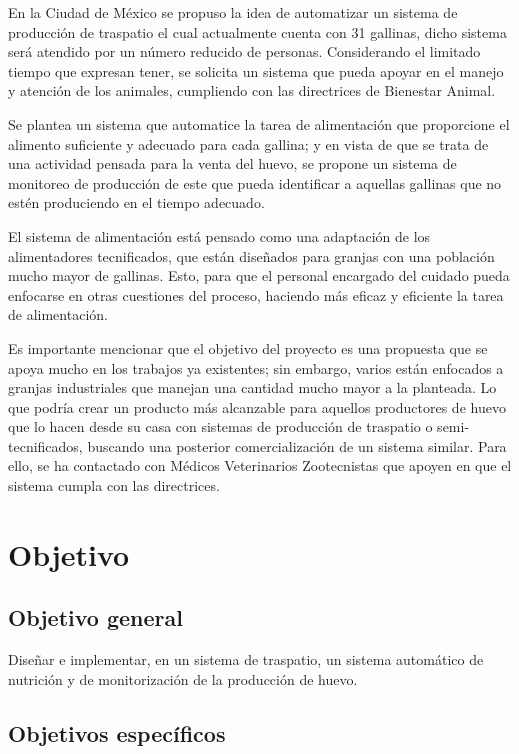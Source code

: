 En la Ciudad de México se propuso la idea de automatizar un sistema de producción de traspatio el cual actualmente cuenta con 31 gallinas, dicho sistema será atendido por un número reducido de personas. Considerando el limitado tiempo que expresan tener, se solicita un sistema que pueda apoyar en el manejo y atención de los animales, cumpliendo con las directrices de Bienestar Animal.

Se plantea un sistema que automatice la tarea de alimentación que proporcione el alimento suficiente y adecuado para cada gallina; y en vista de que se trata de una actividad pensada para la venta del huevo, se propone un sistema de monitoreo de producción de este que pueda identificar a aquellas gallinas que no estén produciendo en el tiempo adecuado.

El sistema de alimentación está pensado como una adaptación de los alimentadores tecnificados, que están diseñados para granjas con una población mucho mayor de gallinas. Esto, para que el personal encargado del cuidado pueda enfocarse en otras cuestiones del proceso, haciendo más eficaz y eficiente la tarea de alimentación.

Es importante mencionar que el objetivo del proyecto es una propuesta que se apoya mucho en los trabajos ya existentes; sin embargo, varios están enfocados a granjas industriales que manejan una cantidad mucho mayor a la planteada. Lo que podría crear un producto más alcanzable para aquellos productores de huevo que lo hacen desde su casa con sistemas de producción de traspatio o semi-tecnificados, buscando una posterior comercialización de un sistema similar. Para ello, se ha contactado con Médicos Veterinarios Zootecnistas que apoyen en que el sistema cumpla con las directrices.

\newpage
\section{Objetivo}
%

\subsection{Objetivo general}
Diseñar e implementar, en un sistema de traspatio, un sistema automático de nutrición y de monitorización de la producción de huevo.

\subsection{Objetivos específicos}

